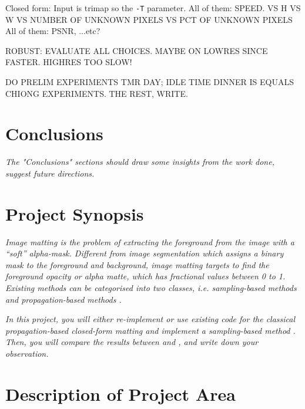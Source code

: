 \documentclass{article}
\begin{document}
\begin{multicols}{2}[]


Closed form: Input is trimap so the \verb|-T| parameter.
All of them: SPEED. VS H VS W VS NUMBER OF UNKNOWN PIXELS VS PCT OF UNKNOWN PIXELS
All of them: PSNR, ...etc?

ROBUST: EVALUATE ALL CHOICES. MAYBE ON LOWRES SINCE FASTER. HIGHRES TOO SLOW!

DO PRELIM EXPERIMENTS TMR DAY; IDLE TIME DINNER IS EQUALS CHIONG EXPERIMENTS. THE REST, WRITE.


\section{Conclusions}
\emph{The "Conclusions" sections should draw some insights from the work done, suggest future directions.}

\end{multicols}
\newpage
\setcounter{section}{-1}
\section{Project Synopsis}
\emph{Image matting is the problem of extracting the foreground from the image with a ``soft'' alpha-mask. Different from image segmentation which assigns a binary mask to the foreground and background, image matting targets to find the foreground opacity or alpha matte, which has fractional values between 0 to 1. Existing methods can be categorised into two classes, i.e. sampling-based methods \cite{bayesian-matting, robust-matting} and propagation-based methods \cite{poisson-matting, closed-form-matting}.}

\emph{In this project, you will either re-implement or use existing code for the classical propagation-based closed-form matting \cite{closed-form-matting} and implement a sampling-based method \cite{robust-matting}. Then, you will compare the results between \cite{closed-form-matting} and \cite{robust-matting}, and write down your observation.}

\section{Description of Project Area}
\end{document}
